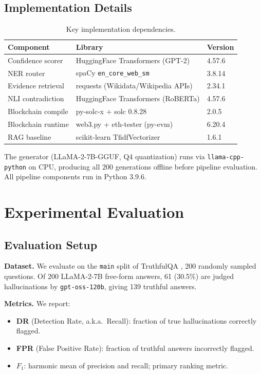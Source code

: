 \documentclass[11pt,a4paper]{article}
\newcommand{\fone}{F_1}
\begin{document}
\subsection{Implementation Details}

\begin{table}[htb]
\centering
\caption{Key implementation dependencies.}
\label{tab:impl}
\small
\begin{tabular}{lll}
\toprule
\textbf{Component} & \textbf{Library} & \textbf{Version} \\
\midrule
Confidence scorer & HuggingFace Transformers (GPT-2)     & 4.57.6  \\
NER router        & spaCy \texttt{en\_core\_web\_sm}     & 3.8.14  \\
Evidence retrieval& requests (Wikidata/Wikipedia APIs)   & 2.34.1  \\
NLI contradiction & HuggingFace Transformers (RoBERTa)  & 4.57.6  \\
Blockchain compile& py-solc-x + solc 0.8.28             & 2.0.5   \\
Blockchain runtime& web3.py + eth-tester (py-evm)       & 6.20.4  \\
RAG baseline      & scikit-learn TfidfVectorizer         & 1.6.1   \\
\bottomrule
\end{tabular}
\end{table}

The generator (LLaMA-2-7B-GGUF, Q4 quantization) runs via
\texttt{llama-cpp-python} on CPU, producing all 200 generations offline before
pipeline evaluation. All pipeline components run in Python 3.9.6.

\section{Experimental Evaluation}
\label{sec:experiments}

\subsection{Evaluation Setup}

\textbf{Dataset.} We evaluate on the \texttt{main} split of TruthfulQA
\citep{lin2022truthfulqa}, 200 randomly sampled questions. Of 200 LLaMA-2-7B
free-form answers, 61 (30.5\%) are judged hallucinations by
\texttt{gpt-oss-120b}, giving 139 truthful answers.

\textbf{Metrics.} We report:
\begin{itemize}
\item \textbf{DR} (Detection Rate, a.k.a.\ Recall): fraction of true
      hallucinations correctly flagged.
\item \textbf{FPR} (False Positive Rate): fraction of truthful answers
      incorrectly flagged.
\item \textbf{$\fone$}: harmonic mean of precision and recall; primary ranking
      metric.
\end{itemize}
\end{document}
